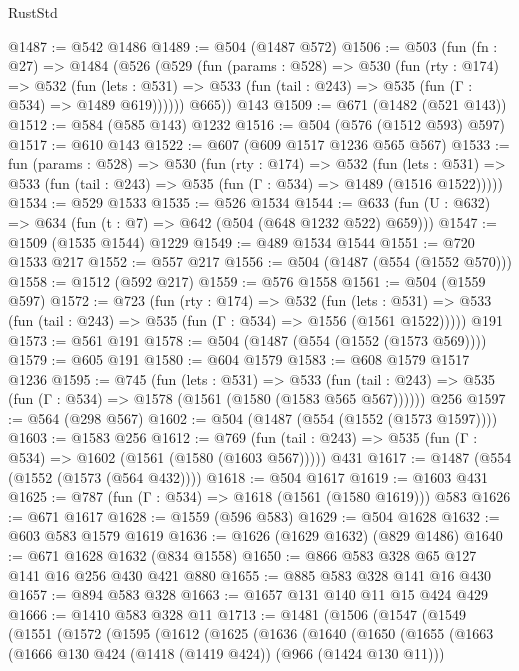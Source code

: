 \begin{lexlean}{RustStd}
\begin{coremodule}
@1487 := @542 @1486
@1489 := @504 (@1487 @572)
@1506 := @503
    (fun (fn : @27) =>
    @1484
      (@526
        (@529
          (fun (params : @528) =>
          @530
            (fun (rty : @174) =>
            @532
              (fun (lets : @531) =>
              @533 (fun (tail : @243) => @535 (fun (Γ : @534) => @1489 @619))))))
        @665))
    @143
@1509 := @671 (@1482 (@521 @143))
@1512 := @584 (@585 @143) @1232
@1516 := @504 (@576 (@1512 @593) @597)
@1517 := @610 @143
@1522 := @607 (@609 @1517 @1236 @565 @567)
@1533 := fun (params : @528) =>
  @530
    (fun (rty : @174) =>
    @532
      (fun (lets : @531) =>
      @533 (fun (tail : @243) => @535 (fun (Γ : @534) => @1489 (@1516 @1522)))))
@1534 := @529 @1533
@1535 := @526 @1534
@1544 := @633 (fun (U : @632) => @634 (fun (t : @7) => @642 (@504 (@648 @1232 @522) @659)))
@1547 := @1509 (@1535 @1544) @1229
@1549 := @489 @1534 @1544
@1551 := @720 @1533 @217
@1552 := @557 @217
@1556 := @504 (@1487 (@554 (@1552 @570)))
@1558 := @1512 (@592 @217)
@1559 := @576 @1558
@1561 := @504 (@1559 @597)
@1572 := @723
    (fun (rty : @174) =>
    @532
      (fun (lets : @531) =>
      @533 (fun (tail : @243) => @535 (fun (Γ : @534) => @1556 (@1561 @1522)))))
    @191
@1573 := @561 @191
@1578 := @504 (@1487 (@554 (@1552 (@1573 @569))))
@1579 := @605 @191
@1580 := @604 @1579
@1583 := @608 @1579 @1517 @1236
@1595 := @745
    (fun (lets : @531) =>
    @533 (fun (tail : @243) => @535 (fun (Γ : @534) => @1578 (@1561 (@1580 (@1583 @565 @567))))))
    @256
@1597 := @564 (@298 @567)
@1602 := @504 (@1487 (@554 (@1552 (@1573 @1597))))
@1603 := @1583 @256
@1612 := @769
    (fun (tail : @243) => @535 (fun (Γ : @534) => @1602 (@1561 (@1580 (@1603 @567)))))
    @431
@1617 := @1487 (@554 (@1552 (@1573 (@564 @432))))
@1618 := @504 @1617
@1619 := @1603 @431
@1625 := @787 (fun (Γ : @534) => @1618 (@1561 (@1580 @1619))) @583
@1626 := @671 @1617
@1628 := @1559 (@596 @583)
@1629 := @504 @1628
@1632 := @603 @583 @1579 @1619
@1636 := @1626 (@1629 @1632) (@829 @1486)
@1640 := @671 @1628 @1632 (@834 @1558)
@1650 := @866 @583 @328 @65 @127 @141 @16 @256 @430 @421 @880
@1655 := @885 @583 @328 @141 @16 @430
@1657 := @894 @583 @328
@1663 := @1657 @131 @140 @11 @15 @424 @429
@1666 := @1410 @583 @328 @11
@1713 := @1481
    (@1506
      (@1547
        (@1549
          (@1551
            (@1572
              (@1595
                (@1612
                  (@1625
                    (@1636
                      (@1640
                        (@1650
                          (@1655
                            (@1663
                              (@1666 @130 @424 (@1418 (@1419 @424)) (@966 (@1424 @130 @11)))

\end{coremodule}
\end{lexlean}
